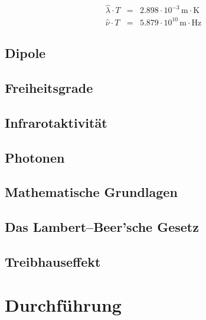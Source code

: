 \documentclass[12pt,a4paper]{scrartcl}
\numberwithin{equation}{section} %
\renewcommand{\[}{} %
\renewcommand{\]}{\noindent} %
\begin{document}
\[
\begin{eqnarray}
    \hat{\lambda}\cdot T &=& 2.898\cdot10^{-3}\mathrm{\,m\cdot K}
        \label{eq:WienLambda}\\
    \hat{\nu}\cdot T &=& 5.879\cdot10^{10} \mathrm{\,m\cdot Hz}
        \label{eq:WienNu}
\end{eqnarray}
\]

\hypertarget{dipole}{%
\subsection{Dipole}\label{dipole}}

\hypertarget{freiheitsgrade}{%
\subsection{Freiheitsgrade}\label{freiheitsgrade}}

\hypertarget{infrarotaktivituxe4t}{%
\subsection{Infrarotaktivität}\label{infrarotaktivituxe4t}}

\hypertarget{photonen}{%
\subsection{Photonen}\label{photonen}}

\hypertarget{mathematische-grundlagen}{%
\subsection{Mathematische Grundlagen}\label{mathematische-grundlagen}}

\hypertarget{das-lambertbeersche-gesetz}{%
\subsection{Das Lambert--Beer'sche
Gesetz}\label{das-lambertbeersche-gesetz}}

\hypertarget{treibhauseffekt}{%
\subsection{Treibhauseffekt}\label{treibhauseffekt}}

\clearpage
\hypertarget{durchfuxfchrung}{%
\section{Durchführung}\label{durchfuxfchrung}}
\end{document}
